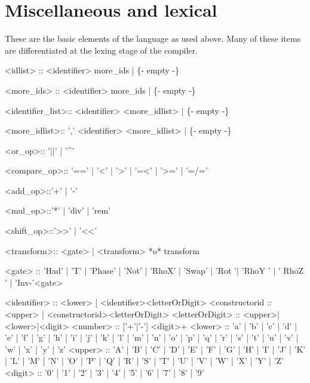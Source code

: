 \section{Miscellaneous and lexical}\label{sec:bnfMiscLexicalDefinition}
These are the basic elements of the language as used above. Many of these
items are differentiated at the lexing stage of the compiler.

\begin{singlespace}
\begin{bnf}   

   <idlist> :: <identifier> more_ids
        | \{- empty -\}
 
   <more_ids> :: <identifier> more_ids
        | \{- empty -\}
 
   <identifier_list>:: <identifier> <more_idlist>
        | \{- empty -\}

   <more_idlist>:: ',' <identifier> <more_idlist> 
        | \{- empty -\}
    
  
   <or_op>:: '||' | '^'
  
   <compare_op>:: '==' | '<' | '>' | '=<' | '>=' | '=/=' 

   <add_op>::'+' | '-' 

   <mul_op>::'*' | 'div'  | 'rem'

   <shift_op>::'>>' | '<<'

   <transform>:: <gate> 
        | <transform> *o* transform 

   <gate> :: 'Had' | 'T'  | 'Phase' | 'Not' |  'RhoX'  
	| 'Swap' | 'Rot '| 'RhoY ' | '  RhoZ ' | 'Inv-'<gate>

   <identifier> :: <lower> | <identifier><letterOrDigit>
   <constructorid :: <upper> | <constructorid><letterOrDigit>
   <letterOrDigit> :: <upper>|<lower>|<digit>
   <number> :: ['+'|'-'] <digit>+
   <lower> ::   'a' | 'b' | 'c' | 'd' | 'e' | 'f' | 'g' 
        | 'h' | 'i' | 'j' | 'k' | 'l' | 'm' | 'n' | 'o' 
        | 'p' | 'q' | 'r' | 's' | 't' | 'u' | 'v' | 'w' 
	| 'x' | 'y' | 'z'
   <upper> ::   'A' | 'B' | 'C' | 'D' | 'E' | 'F' | 'G' 
        | 'H' | 'I' | 'J' | 'K' | 'L' | 'M' | 'N' | 'O' 
        | 'P' | 'Q' | 'R' | 'S' | 'T' | 'U' | 'V' | 'W' 
        | 'X' | 'Y' | 'Z'
   <digit> ::   '0' | '1' | '2' | '3' | '4' | '5' | '6' 
        | '7' | '8' | '9'
\end{bnf}
\end{singlespace}